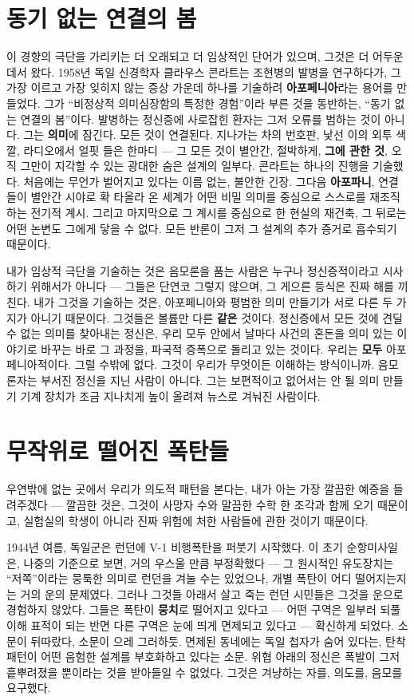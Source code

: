 \section*{동기 없는 연결의 봄}

이 경향의 극단을 가리키는 더 오래되고 더 임상적인 단어가 있으며, 그것은 더 어두운 데서 왔다. 1958년 독일 신경학자 클라우스 콘라트는 조현병의 발병을 연구하다가, 그 가장 이르고 가장 잊히지 않는 증상 가운데 하나를 기술하려 \textbf{아포페니아}라는 용어를 만들었다. 그가 ``비정상적 의미심장함의 특정한 경험''이라 부른 것을 동반하는, ``동기 없는 연결의 봄''이다. 발병하는 정신증에 사로잡힌 환자는 그저 오류를 범하는 것이 아니다. 그는 \textbf{의미}에 잠긴다. 모든 것이 연결된다. 지나가는 차의 번호판, 낯선 이의 외투 색깔, 라디오에서 얼핏 들은 한마디 — 그 모든 것이 별안간, 절박하게, \textbf{그에 관한 것}, 오직 그만이 지각할 수 있는 광대한 숨은 설계의 일부다. 콘라트는 하나의 진행을 기술했다. 처음에는 무언가 벌어지고 있다는 이름 없는, 불안한 긴장. 그다음 \textbf{아포파니}, 연결들이 별안간 시야로 확 타올라 온 세계가 어떤 비밀 의미를 중심으로 스스로를 재조직하는 전기적 계시. 그리고 마지막으로 그 계시를 중심으로 한 현실의 재건축, 그 뒤로는 어떤 논변도 그에게 닿을 수 없다. 모든 반론이 그저 그 설계의 추가 증거로 흡수되기 때문이다.

내가 임상적 극단을 기술하는 것은 음모론을 품는 사람은 누구나 정신증적이라고 시사하기 위해서가 아니다 — 그들은 단연코 그렇지 않으며, 그 게으른 등식은 진짜 해를 끼친다. 내가 그것을 기술하는 것은, 아포페니아와 평범한 의미 만들기가 서로 다른 두 가지가 아니기 때문이다. 그것들은 볼륨만 다른 \textbf{같은} 것이다. 정신증에서 모든 것에 견딜 수 없는 의미를 찾아내는 정신은, 우리 모두 안에서 날마다 사건의 혼돈을 의미 있는 이야기로 바꾸는 바로 그 과정을, 파국적 증폭으로 돌리고 있는 것이다. 우리는 \textbf{모두} 아포페니아적이다. 그럴 수밖에 없다. 그것이 우리가 무엇이든 이해하는 방식이니까. 음모론자는 부서진 정신을 지닌 사람이 아니다. 그는 보편적이고 없어서는 안 될 의미 만들기 기계 장치가 조금 지나치게 높이 올려져 뉴스로 겨눠진 사람이다.

\section*{무작위로 떨어진 폭탄들}

우연밖에 없는 곳에서 우리가 의도적 패턴을 본다는, 내가 아는 가장 깔끔한 예증을 들려주겠다 — 깔끔한 것은, 그것이 사망자 수와 말끔한 수학 한 조각과 함께 오기 때문이고, 실험실의 학생이 아니라 진짜 위험에 처한 사람들에 관한 것이기 때문이다.

1944년 여름, 독일군은 런던에 V-1 비행폭탄을 퍼붓기 시작했다. 이 초기 순항미사일은, 나중의 기준으로 보면, 거의 우스울 만큼 부정확했다 — 그 원시적인 유도장치는 ``저쪽''이라는 뭉툭한 의미로 런던을 겨눌 수는 있었으나, 개별 폭탄이 어디 떨어지는지는 거의 운의 문제였다. 그러나 그것들 아래서 살고 죽는 런던 시민들은 그것을 운으로 경험하지 않았다. 그들은 폭탄이 \textbf{뭉치}로 떨어지고 있다고 — 어떤 구역은 일부러 되풀이해 표적이 되는 반면 다른 구역은 눈에 띄게 면제되고 있다고 — 확신하게 되었다. 소문이 뒤따랐다, 소문이 으레 그러하듯. 면제된 동네에는 독일 첩자가 숨어 있다는, 탄착 패턴이 어떤 음험한 설계를 부호화하고 있다는 소문. 위협 아래의 정신은 폭발이 그저 흩뿌려졌을 뿐이라는 것을 받아들일 수 없었다. 그것은 겨냥하는 자를, 의도를, 음모를 요구했다.

